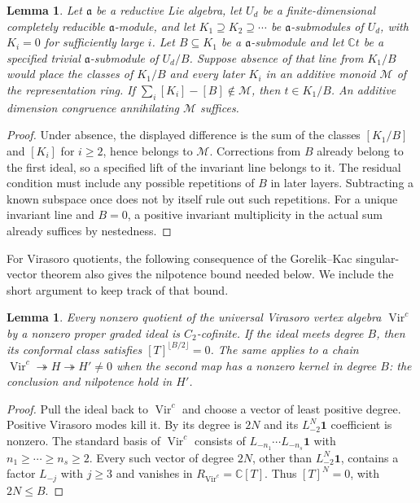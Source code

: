\documentclass[11pt,a4paper]{amsart}
\numberwithin{equation}{section}
\newtheorem{lemma}[theorem]{Lemma}
\theoremstyle{definition}
\theoremstyle{remark}
\newcommand{\C}{\mathbb C}
\newcommand{\Vir}{\operatorname{Vir}}
\begin{document}
\begin{lemma}\label{v3:scalar-detection}
Let $\mathfrak a$ be a reductive Lie algebra, let $U_d$ be a
finite-dimensional completely reducible $\mathfrak a$-module, and let
$K_1\supseteq K_2\supseteq\cdots$ be $\mathfrak a$-submodules of
$U_d$, with $K_i=0$ for sufficiently large $i$. Let
$B\subseteq K_1$ be a $\mathfrak a$-submodule and let $\C t$ be
a specified trivial $\mathfrak a$-submodule of $U_d/B$.
Suppose absence of that line from $K_1/B$ would place the classes of
$K_1/B$ and every later $K_i$ in an additive monoid $\mathcal M$ of
the representation ring. If
$\sum_i[K_i]-[B]\notin\mathcal M$, then $t\in K_1/B$.
An additive dimension congruence annihilating $\mathcal M$ suffices.
\end{lemma}
\begin{proof}
Under absence, the displayed difference is the sum of the classes
$[K_1/B]$ and $[K_i]$ for $i\ge2$, hence belongs to $\mathcal M$.
Corrections from $B$ already belong to the first ideal, so a
specified lift of the invariant line belongs to it. The residual
condition must include any possible repetitions of $B$ in later
layers. Subtracting a known subspace once does not by itself rule out such repetitions.
For a unique invariant line and $B=0$, a positive invariant multiplicity
in the actual sum already suffices by nestedness.
\end{proof}


For Virasoro quotients, the following consequence of the
Gorelik--Kac singular-vector theorem \cite[Theorem~0.3.2]{GK}
also gives the nilpotence bound needed below. We include the short
argument to keep track of that bound.

\begin{lemma}\label{v3:vir-quotient}
Every nonzero quotient of the universal Virasoro vertex algebra $\Vir^c$ by a nonzero
proper graded ideal is $C_2$-cofinite. If the ideal meets degree $B$,
then its conformal class satisfies $[T]^{\lfloor B/2\rfloor}=0$.
The same applies to a chain $\Vir^c\twoheadrightarrow H
\twoheadrightarrow H'\ne0$ when the second map has a nonzero kernel
in degree $B$: the conclusion and nilpotence hold in $H'$.
\end{lemma}
\begin{proof}
Pull the ideal back to $\Vir^c$ and choose a vector of least positive
degree. Positive Virasoro modes kill it. By \cite[Theorem 0.3.2]{GK}
its degree is $2N$ and its $L_{-2}^N\mathbf1$ coefficient is nonzero.
The standard basis of $\Vir^c$ consists of
$L_{-n_1}\cdots L_{-n_s}\mathbf1$ with $n_1\ge\cdots\ge n_s\ge2$.
Every such vector of degree $2N$, other than $L_{-2}^N\mathbf1$,
contains a factor $L_{-j}$ with $j\ge3$ and vanishes in
$R_{\Vir^c}=\C[T]$. Thus $[T]^N=0$, with $2N\le B$.

\end{proof}
\end{document}
